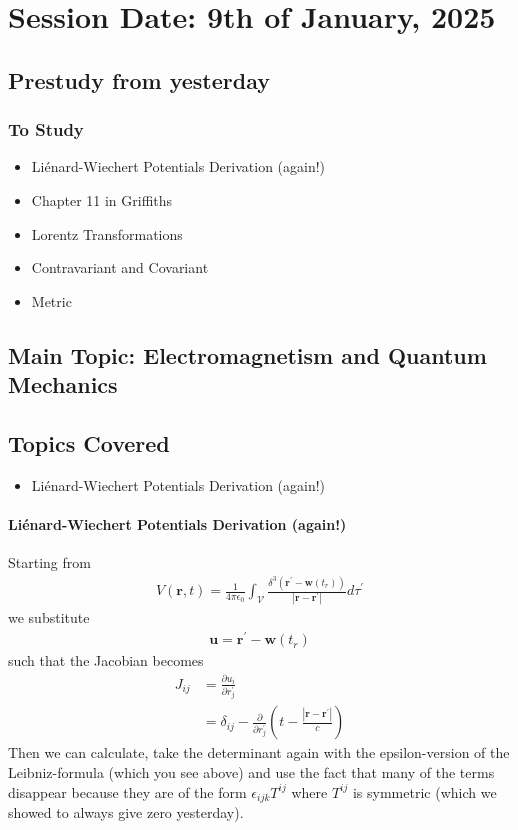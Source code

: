 \section{Session Date: 9th of January, 2025}
\subsection*{Prestudy from yesterday}
\subsubsection*{To Study}
\begin{itemize}
    \item Liénard-Wiechert Potentials Derivation (again!)
    \item Chapter 11 in Griffiths
    \item Lorentz Transformations
    \item Contravariant and Covariant
    \item Metric
\end{itemize}

\subsection*{Main Topic: Electromagnetism and Quantum Mechanics}
\subsection*{Topics Covered}
\begin{itemize}
    \item Liénard-Wiechert Potentials Derivation (again!) 
\end{itemize}
\paragraph{Liénard-Wiechert Potentials Derivation (again!)}
Starting from \begin{align*}
    V(\mathbf{r}, t) = \frac{1}{4\pi\epsilon_0} \int_{\mathcal{V}}  \frac{\delta ^3 (\mathbf{r}^{\prime} - \mathbf{w}(t_r))}{\left| \mathbf{r} - \mathbf{r}^{\prime}  \right| }d \tau ^{\prime} 
\end{align*}
we substitute \begin{align*}
    \mathbf{u} = \mathbf{r}^{\prime} - \mathbf{w}(t_r)
\end{align*}
such that the Jacobian becomes \begin{align*}
    J_{ij} &= \frac{\partial u_i}{\partial r^{\prime} _j} \\
    &=\delta _{ij} - \frac{\partial}{\partial r^{\prime} _j}\left( t - \frac{\left| \mathbf{r} - \mathbf{r}^{\prime}  \right| }{c} \right)  
\end{align*}
Then we can calculate, take the determinant again with the epsilon-version of the Leibniz-formula (which you see above) and use the fact that many of the terms disappear because they are of the form \(\epsilon _{ijk}T^{ij}\) where \(T^{ij}\) is symmetric (which we showed to always give zero yesterday).  

